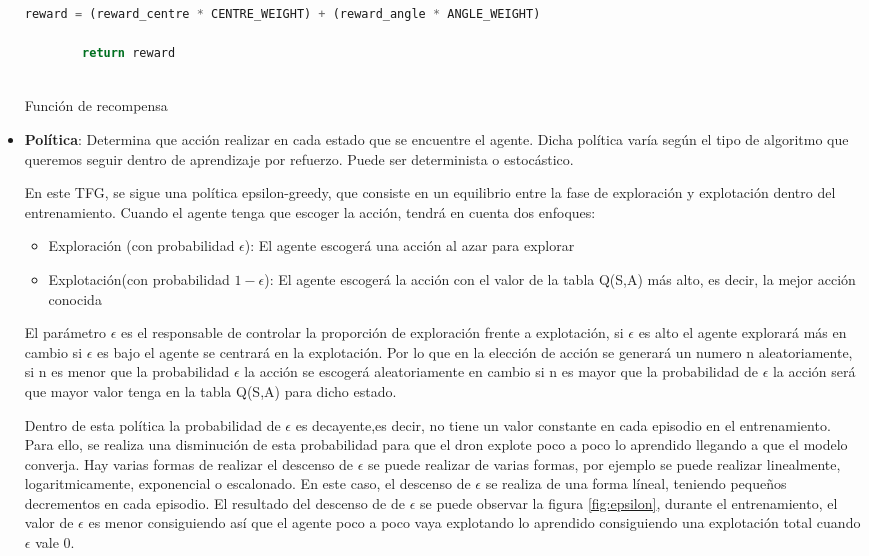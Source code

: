 \begin{itemize}
\begin{code}[H]
\begin{lstlisting}[language=Python]
            reward = (reward_centre * CENTRE_WEIGHT) + (reward_angle * ANGLE_WEIGHT)
            
        return reward
       
      \end{lstlisting}
      \caption[Función de recompensa]{Función de recompensa}
      \label{cod:recompensa}
      \end{code}
    \item \textbf{Política}: Determina que acción realizar en cada estado que se encuentre el agente. Dicha política varía según el tipo de algoritmo que queremos seguir 
    dentro de aprendizaje por refuerzo. Puede ser determinista o estocástico.

    En este TFG, se sigue una política epsilon-greedy\cite{Epsilon-greedy}, que consiste en un equilibrio entre la fase de exploración y explotación dentro 
    del entrenamiento. Cuando el agente tenga que escoger la acción, tendrá en cuenta dos enfoques:
 
 \begin{itemize}
   \item Exploración (con probabilidad $\epsilon$): El agente escogerá una acción al azar para explorar
   \item Explotación(con probabilidad $ 1 - \epsilon$): El agente escogerá la acción con el valor de la tabla Q(S,A) más alto, es decir, la mejor acción conocida
 \end{itemize}
 
 El parámetro $\epsilon$ es el responsable de controlar la proporción de exploración frente a explotación, si $\epsilon$ es alto el agente explorará más en cambio si $\epsilon$ es bajo
 el agente se centrará en la explotación. Por lo que en la elección de acción se generará un numero n aleatoriamente, si n es menor que la probabilidad $\epsilon$ la acción se escogerá aleatoriamente
 en cambio si n es mayor que la probabilidad de $\epsilon$ la acción será que mayor valor tenga en la tabla Q(S,A) para dicho estado. \newline
 
 Dentro de esta política la probabilidad de $\epsilon$ es decayente,es decir, no tiene un valor constante en cada episodio en el entrenamiento. Para ello, se realiza una disminución 
 de esta probabilidad para que el dron explote poco a poco lo aprendido llegando a que el modelo converja. Hay varias formas de realizar el descenso
 de $\epsilon$ se puede realizar de varias formas, por ejemplo se puede realizar linealmente, logaritmicamente, exponencial o escalonado. En este caso, el descenso de $\epsilon$ se realiza 
 de una forma líneal, teniendo pequeños decrementos en cada episodio. El resultado del descenso de de $\epsilon$ se puede observar la figura \ref{fig:epsilon}, durante el entrenamiento, el valor
 de $\epsilon$ es menor consiguiendo así que el agente poco a poco vaya explotando lo aprendido consiguiendo una explotación total cuando $\epsilon$ vale 0. 


\end{itemize}

